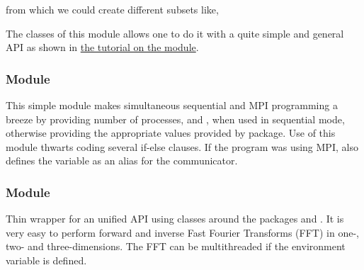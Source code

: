 
from which we could create different subsets like,


The classes of this module allows one to do it with a quite simple and general
API as shown in
\href{http://fluiddyn.readthedocs.io/en/latest/ipynb/tuto_serieofarrays.html}{%
the tutorial on the module}.

\subsubsection*{Module }

This simple module makes simultaneous sequential and MPI programming a breeze
by providing number of processes,  and , when used in sequential mode, otherwise providing the appropriate values
provided by  package. Use of this module thwarts coding several if-else
clauses. If the program was using MPI, also defines the variable
 as an alias for the  communicator.

\subsubsection*{Module }

Thin wrapper for an unified API using classes around the packages 
and .  It is very easy to perform forward and inverse Fast
Fourier Transforms (FFT) in one-, two- and three-dimensions.
The FFT can be multithreaded if the environment variable
 is defined.

